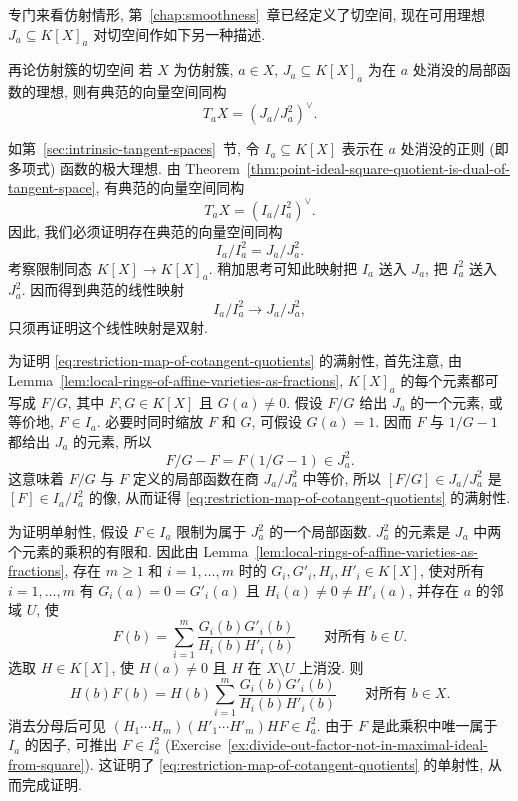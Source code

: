 专门来看仿射情形, 第~\ref{chap:smoothness}~章已经定义了切空间, 现在可用理想 $J_{a}\subseteq K[X]_{a}$ 对切空间作如下另一种描述.

\begin{Proposition}{再论仿射簇的切空间}\leavevmode\label{prop:affine-tangent-space-dual-of-local-maximal-ideal-quotient}
若 $X$ 为仿射簇, $a\in X$, $J_{a}\subseteq K[X]_{a}$ 为在 $a$ 处消没的局部函数的理想, 则有典范的向量空间同构
\[
  T_{a}X=(J_{a}/J_{a}^{2})^{\vee}.
\]
\end{Proposition}
\begin{Proof}
如第~\ref{sec:intrinsic-tangent-spaces}~节, 令 $I_{a}\subseteq K[X]$ 表示在 $a$ 处消没的正则 (即多项式) 函数的极大理想. 由 Theorem~\ref{thm:point-ideal-square-quotient-is-dual-of-tangent-space}, 有典范的向量空间同构
\[
  T_{a}X=(I_{a}/I_{a}^{2})^{\vee}.
\]
因此, 我们必须证明存在典范的向量空间同构
\[
  I_{a}/I_{a}^{2}=J_{a}/J_{a}^{2}.
\]
考察限制同态 $K[X]\to K[X]_{a}$. 稍加思考可知此映射把 $I_{a}$ 送入 $J_{a}$, 把 $I_{a}^{2}$ 送入 $J_{a}^{2}$. 因而得到典范的线性映射
\begin{equation}\label{eq:restriction-map-of-cotangent-quotients}
  I_{a}/I_{a}^{2}\to J_{a}/J_{a}^{2},
\end{equation}
只须再证明这个线性映射是双射.

为证明 \eqref{eq:restriction-map-of-cotangent-quotients} 的满射性, 首先注意, 由 Lemma~\ref{lem:local-rings-of-affine-varieties-as-fractions}, $K[X]_{a}$ 的每个元素都可写成 $F/G$, 其中 $F,G\in K[X]$ 且 $G(a)\ne0$. 假设 $F/G$ 给出 $J_{a}$ 的一个元素, 或等价地, $F\in I_{a}$. 必要时同时缩放 $F$ 和 $G$, 可假设 $G(a)=1$. 因而 $F$ 与 $1/G-1$ 都给出 $J_{a}$ 的元素, 所以
\[
  F/G-F=F(1/G-1)\in J_{a}^{2}.
\]
这意味着 $F/G$ 与 $F$ 定义的局部函数在商 $J_{a}/J_{a}^{2}$ 中等价, 所以 $[F/G]\in J_{a}/J_{a}^{2}$ 是 $[F]\in I_{a}/I_{a}^{2}$ 的像, 从而证得 \eqref{eq:restriction-map-of-cotangent-quotients} 的满射性.

为证明单射性, 假设 $F\in I_{a}$ 限制为属于 $J_{a}^{2}$ 的一个局部函数. $J_{a}^{2}$ 的元素是 $J_{a}$ 中两个元素的乘积的有限和. 因此由 Lemma~\ref{lem:local-rings-of-affine-varieties-as-fractions}, 存在 $m\ge1$ 和 $i=1,\ldots,m$ 时的 $G_{i},G'_{i},H_{i},H'_{i}\in K[X]$, 使对所有 $i=1,\ldots,m$ 有 $G_{i}(a)=0=G'_{i}(a)$ 且 $H_{i}(a)\ne0\ne H'_{i}(a)$, 并存在 $a$ 的邻域 $U$, 使
\[
  F(b)=\sum_{i=1}^{m}\frac{G_{i}(b)G'_{i}(b)}{H_{i}(b)H'_{i}(b)}
  \qquad\text{对所有 }b\in U.
\]
选取 $H\in K[X]$, 使 $H(a)\ne0$ 且 $H$ 在 $X\setminus U$ 上消没. 则
\[
  H(b)F(b)=H(b)\sum_{i=1}^{m}\frac{G_{i}(b)G'_{i}(b)}{H_{i}(b)H'_{i}(b)}
  \qquad\text{对所有 }b\in X.
\]
消去分母后可见 $(H_{1}\cdots H_{m})(H'_{1}\cdots H'_{m})HF\in I_{a}^{2}$. 由于 $F$ 是此乘积中唯一属于 $I_{a}$ 的因子, 可推出 $F\in I_{a}^{2}$ (Exercise~\ref{ex:divide-out-factor-not-in-maximal-ideal-from-square}). 这证明了 \eqref{eq:restriction-map-of-cotangent-quotients} 的单射性, 从而完成证明.
\end{Proof}

